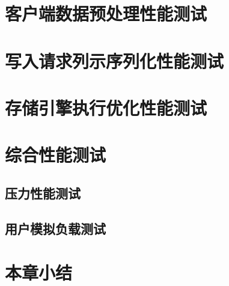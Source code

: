 \section{客户端数据预处理性能测试}
\section{写入请求列示序列化性能测试}
\section{存储引擎执行优化性能测试}
\section{综合性能测试}
\subsection{压力性能测试}
\subsection{用户模拟负载测试}
\section{本章小结}